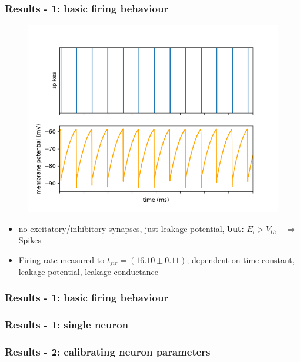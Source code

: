 \documentclass{beamer}
\begin{document}
\begin{frame}
    \frametitle{Results - 1: basic firing behaviour} 
    \begin{figure}
    		\centering
    		\includegraphics[width=0.6\linewidth]{figures/fp_task1_1membrane.png}
    \end{figure}
    
    \begin{itemize}
    		\item no excitatory/inhibitory synapses,  just leakage potential,  
    		\textbf{but: } $E_l>V_{th}\quad \Rightarrow$ Spikes
    		\item Firing rate measured to $t_{fir} = (16.10\pm 0.11)$; dependent on 
    		time constant, leakage potential,  leakage conductance
    \end{itemize}
\end{frame}

\begin{frame}
    \frametitle{Results - 1: basic firing behaviour} 
\end{frame}

\begin{frame}
    \frametitle{Results - 1: single neuron} 
    
    
\end{frame}

\begin{frame}
    \frametitle{Results - 2: calibrating neuron parameters} 
\end{frame}
\end{document}
